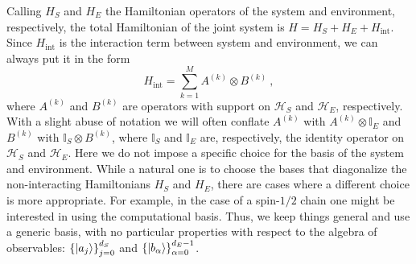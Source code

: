 \documentclass[draft,nofootinbib,pre,twocolumn,showpacs,showkeys,preprintnumbers,floatfix]{revtex4-1}
\newcommand{\1}{\mathbbm{1}}
\begin{document}
Calling $H_S$ and $H_E$ the Hamiltonian operators of the system and environment, respectively, 
the total Hamiltonian of the joint system is $H = H_S + H_E + H_{\mathrm{int}}$. Since $H_{\mathrm{int}}$
is the interaction term between system and environment, we can always put it in the form
\begin{equation}
H_{\mathrm{int}} = \sum_{k=1}^M A^{(k)} \otimes B^{(k)}~,
\end{equation}
where $A^{(k)}$ and $B^{(k)}$ are operators with support on $\mathcal{H}_S$ and $\mathcal{H}_E$,
respectively. With a slight abuse of notation we will often conflate $A^{(k)}$ with $A^{(k)}\otimes \mathbb{I}_E$
and $B^{(k)}$ with $\mathbb{I}_S \otimes B^{(k)}$, where $\mathbb{I}_S$ and $\mathbb{I}_E$ are, respectively,
the identity operator on $\mathcal{H}_{S}$ and $\mathcal{H}_E$.
Here we do not impose a specific choice for the basis of the system and environment. While a natural one
is to choose the bases that diagonalize the non-interacting Hamiltonians $H_S$ and $H_E$, there are cases
where a different choice is more appropriate. For example, in the case of a spin-$1/2$ chain one might be interested 
in using the computational basis. Thus, we keep things general and use a generic basis, with no particular 
properties with respect to the algebra of observables: $\left\{ \ket{a_j}\right\}_{j=0}^{d_S}$ and $\left\{ \ket{b_\alpha}\right\}_{\alpha=0}^{d_E-1}$.
\end{document}
